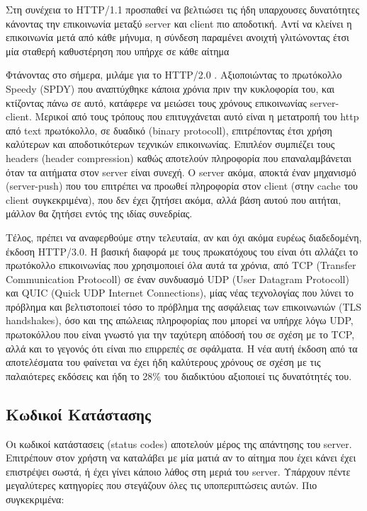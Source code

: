 Στη συνέχεια το HTTP/1.1 προσπαθεί να βελτιώσει τις ήδη υπαρχουσες δυνατότητες κάνοντας την επικοινωνία
μεταξύ server και client πιο αποδοτική. Αντί να κλείνει η επικοινωνία μετά από κάθε μήνυμα, η σύνδεση παραμένει
ανοιχτή γλιτώνοντας έτσι μία σταθερή καθυστέρηση που υπήρχε σε κάθε αίτημα

Φτάνοντας στο σήμερα, μιλάμε για το HTTP/2.0 \cite{http2}. Αξιοποιώντας το πρωτόκολλο Speedy (SPDY) που αναπτύχθηκε κάποια χρόνια πριν
την κυκλοφορία του, και κτίζοντας πάνω σε αυτό, κατάφερε να μειώσει τους χρόνους επικοινωνίας server-client.
Μερικοί από τους τρόπους που επιτυγχάνεται αυτό είναι η μετατροπή του http από text πρωτόκολλο, σε δυαδικό (binary protocoll), επιτρέποντας έτσι χρήση καλύτερων
και αποδοτικότερων τεχνικών επικοινωνίας. Επιπλέον συμπιέζει τους headers (header compression) καθώς αποτελούν πληροφορία που
επαναλαμβάνεται όταν τα αιτήματα στον server είναι συνεχή. Ο server ακόμα, αποκτά έναν μηχανισμό (server-push) που του
επιτρέπει να προωθεί πληροφορία στον client (στην cache του client συγκεκριμένα), που δεν έχει ζητήσει ακόμα, αλλά βάση αυτού
που αιτήται, μάλλον θα ζητήσει εντός της ιδίας συνεδρίας.

Τέλος, πρέπει να αναφερθούμε στην τελευταία, αν και όχι ακόμα ευρέως διαδεδομένη, έκδοση HTTP/3.0. H βασική διαφορά με τους
πρωκατόχους του είναι ότι αλλάζει το πρωτόκολλο επικοινωνίας που χρησιμοποιεί όλα αυτά τα χρόνια, από TCP (Transfer Communication Protocoll) σε
έναν συνδυασμό UDP (User Datagram Protocoll) και QUIC (Quick UDP Internet Connections), μίας νέας τεχνολογίας που λύνει το πρόβλημα και βελτιστοποιεί τόσο το πρόβλημα 
της ασφάλειας των επικοινωνιών (TLS handshakes), όσο και της απώλειας πληροφορίας που μπορεί να υπήρχε λόγω UDP, πρωτοκόλλου που είναι γνωστό
για την ταχύτερη απόδοσή του σε σχέση με το TCP, αλλά και το γεγονός ότι είναι πιο επιρρεπές σε σφάλματα. Η νέα αυτή έκδοση από τα αποτελέσματα 
του \cite{http3} φαίνεται να έχει ήδη καλύτερους χρόνους σε σχέση με τις παλαιότερες εκδόσεις και ήδη το 28\% του διαδικτύου αξιοποιεί τις δυνατότητές του. 


\subsection{Κωδικοί Κατάστασης}
\label{subsec:http_status_codes}

Οι κωδικοί κατάστασεις (status codes) αποτελούν μέρος της απάντησης του server. Επιτρέπουν στον χρήστη να καταλάβει με μία ματιά αν το αίτημα που έχει κάνει έχει επιστρέψει σωστά, ή έχει γίνει κάποιο λάθος στη μεριά του server.
Υπάρχουν πέντε μεγαλύτερες κατηγορίες που στεγάζουν όλες τις υποπεριπτώσεις αυτών. Πιο συγκεκριμένα:

